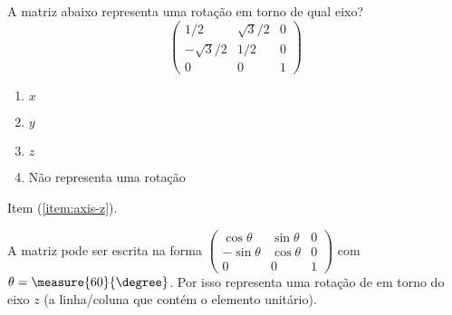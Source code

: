 \begin{question}
    A matriz abaixo representa uma rotação em torno de qual eixo?
    \begin{equation*}
      \begin{pmatrix}
                1/2 & \sqrt{3}/2 & 0 \\
        -\sqrt{3}/2 &        1/2 & 0 \\
                  0 &          0 & 1
      \end{pmatrix}
    \end{equation*}

    \begin{enumerate}
      \item $x$
      \item $y$
      \item\label{item:axis-z} $z$
      \item Não representa uma rotação
    \end{enumerate}

    \begin{answer}
      Item (\ref{item:axis-z}).
    \end{answer}

    \begin{solution}
      A matriz pode ser escrita na forma
      $\begin{pmatrix}
        \cos\theta  & \sin\theta & 0\\
        -\sin\theta & \cos\theta & 0\\
        0           & 0          & 1
      \end{pmatrix}$ com $\theta = \measure{60}{\degree}$.
      Por isso representa uma rotação de  em torno do eixo $z$ (a linha/coluna que contém o elemento unitário).
    \end{solution}
\end{question}